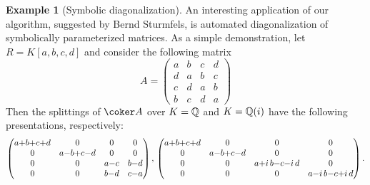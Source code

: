 \documentclass[12pt]{article}
\theoremstyle{theorem}
\numberwithin{thm}{section}
\theoremstyle{definition}
\newtheorem{exa}[thm]{Example}
\newcommand{\mahrud}[1]{{\color{ForestGreen} \sf $\blacklozenge$ Mahrud: [#1]}}
\begin{document}
\begin{exa}[Symbolic diagonalization]\label{ex:diagonalization}
  An interesting application of our algorithm, suggested by Bernd Sturmfels,  is automated diagonalization of symbolically parameterized matrices. As a simple demonstration, let $R = K[a,b,c,d]$ and consider the following matrix
  \[ A = \begin{pmatrix}
    a&b&c&d\\
    d&a&b&c\\
    c&d&a&b\\
    b&c&d&a
  \end{pmatrix} \]
  Then the splittings of $\coker A$ over $K = \mathbb Q$ and $K = \mathbb Q(i)$ have the following presentations, respectively:
  \[\medmuskip0mu \begin{pmatrix}
    a+b+c+d&0&0&0\\
    0&a-b+c-d&0&0\\
    0&0&a-c&b-d\\
    0&0&b-d&c-a
  \end{pmatrix},
  \,
  \begin{pmatrix}
    a+b+c+d&0&0&0\\
    0&a-b+c-d&0&0\\
    0&0&a+i\,b-c-i\,d&0\\
    0&0&0&a-i\,b-c+i\,d
  \end{pmatrix}.
  \]
\end{exa}





\end{document}
